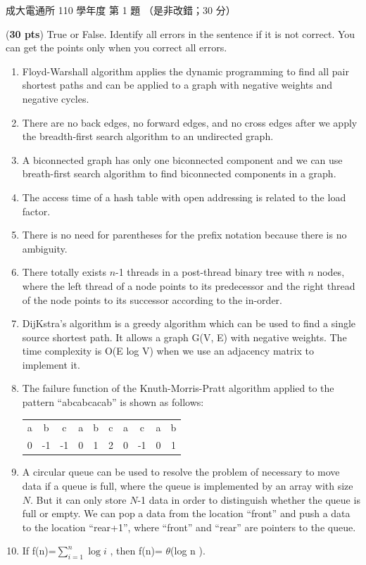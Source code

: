 \begin{pastexam}[label={px:ncku-110-cce-ds-01}]{成大電通所 110 學年度 第 1 題}
（是非改錯；30 分）

(\textbf{30 pts}) True or False. Identify all errors in the sentence if it is not correct. You can get the points only when you correct all errors.
\begin{enumerate}[label=\alph*.]
\item Floyd-Warshall algorithm applies the dynamic programming to find all pair shortest paths and can be applied to a graph with negative weights and negative cycles.
\item There are no back edges, no forward edges, and no cross edges after we apply the breadth-first search algorithm to an undirected graph.
\item A biconnected graph has only one biconnected component and we can use breath-first search algorithm to find biconnected components in a graph.
\item The access time of a hash table with open addressing is related to the load factor.
\item There is no need for parentheses for the prefix notation because there is no ambiguity.
\item There totally exists $n$-1 threads in a post-thread binary tree with $n$ nodes, where the left thread of a node points to its predecessor and the right thread of the node points to its successor according to the in-order.
\item DijKstra's algorithm is a greedy algorithm which can be used to find a single source shortest path. It allows a graph G(V, E) with negative weights. The time complexity is O(E log V) when we use an adjacency matrix to implement it.
\item The failure function of the Knuth-Morris-Pratt algorithm applied to the pattern ``abcabcacab'' is shown as follows:
\begin{center}
\begin{tabular}{cccccccccc}
a & b & c & a & b & c & a & c & a & b\\
0 & -1 & -1 & 0 & 1 & 2 & 0 & -1 & 0 & 1
\end{tabular}
\end{center}
\item A circular queue can be used to resolve the problem of necessary to move data if a queue is full, where the queue is implemented by an array with size $N$. But it can only store $N$-1 data in order to distinguish whether the queue is full or empty. We can pop a data from the location ``front'' and push a data to the location ``rear+1'', where ``front'' and ``rear'' are pointers to the queue.
\item If f(n)=$\sum_{i=1}^{n}\log i$ , then f(n)= $\theta$(log n ).
\end{enumerate}
\end{pastexam}

